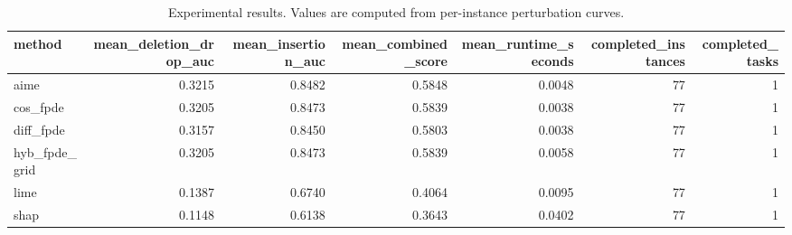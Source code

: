 \begin{table}[t]
\caption{Experimental results. Values are computed from per-instance perturbation curves.}
\label{tab:main_results_computed}
\centering
\begin{tabular}{lrrrrrr}
\toprule
method & mean\_deletion\_drop\_auc & mean\_insertion\_auc & mean\_combined\_score & mean\_runtime\_seconds & completed\_instances & completed\_tasks \\
\midrule
aime & 0.3215 & 0.8482 & 0.5848 & 0.0048 & 77 & 1 \\
cos\_fpde & 0.3205 & 0.8473 & 0.5839 & 0.0038 & 77 & 1 \\
diff\_fpde & 0.3157 & 0.8450 & 0.5803 & 0.0038 & 77 & 1 \\
hyb\_fpde\_grid & 0.3205 & 0.8473 & 0.5839 & 0.0058 & 77 & 1 \\
lime & 0.1387 & 0.6740 & 0.4064 & 0.0095 & 77 & 1 \\
shap & 0.1148 & 0.6138 & 0.3643 & 0.0402 & 77 & 1 \\
\bottomrule
\end{tabular}

\end{table}
